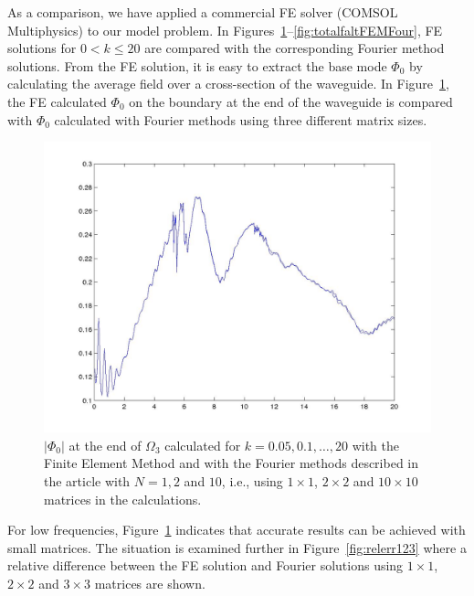 \documentclass{svjour3}
\providecommand{\abs}[1]{\left\lvert#1\right\rvert}
\renewcommand{\Phi}{\varPhi}
\renewcommand{\Phi}{\varPhi}
\begin{document}
As a comparison, we have applied a commercial FE solver (COMSOL
Multiphysics) to our model problem. In
Figures~\ref{fig:FEMvsFourier}--\ref{fig:totalfaltFEMFour}, FE
solutions for $0<k\le20$ are compared with the corresponding Fourier
method solutions. From the FE solution, it is easy to extract the base
mode $\Phi_0$ by calculating the average field over a cross-section of
the waveguide. In Figure~\ref{fig:FEMvsFourier}, the FE calculated
$\Phi_0$ on the boundary at the end of the waveguide is compared with
$\Phi_0$ calculated with Fourier methods using three different matrix
sizes.
\begin{figure}[t]
  \centering
  \includegraphics[width=0.9\linewidth]{FEMvsFourier}
  \caption{$\abs{\Phi_{0}}$ at the end of $\Omega_3$ calculated for
    $k=0.05,0.1,\dots,20$ with the Finite Element Method and with the
    Fourier methods described in the article with $N=1,2$ and $10$,
    i.e., using $1\times1$, $2\times2$ and $10\times10$ matrices in
    the calculations.}
  \label{fig:FEMvsFourier}
\end{figure}

For low frequencies, Figure~\ref{fig:FEMvsFourier} indicates that
accurate results can be achieved with small matrices. The situation is
examined further in Figure~\ref{fig:relerr123} where a relative
difference between the FE solution and Fourier solutions using
$1\times1$, $2\times2$ and $3\times3$ matrices are shown.
\end{document}
